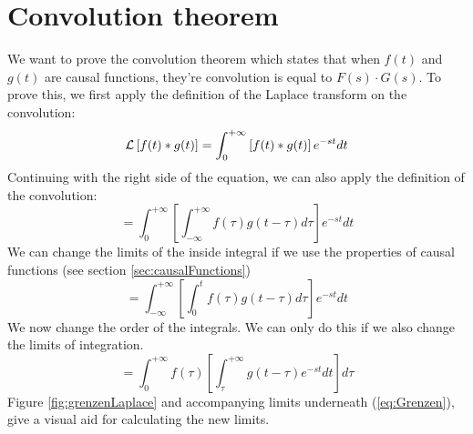 \documentclass[]{subfiles}
\begin{document}
	\section{Convolution theorem}
	We want to prove the convolution theorem which states that when $f(t)$ and $g(t)$ are causal functions, they're convolution is equal to $F(s)\cdot G(s)$. To prove this, we first apply the definition of the Laplace transform on the convolution:
	\begin{equation}
		\mathcal{L}\left[ f(t)\ast g(t)\right]  = \int_{0}^{+\infty}\left[ f(t)\ast g(t)\right] e^{-st}dt
	\end{equation}
	Continuing with the right side of the equation, we can also apply the definition of the convolution:
	\begin{equation}
		=\int_{0}^{+\infty}\left[ \int_{-\infty}^{+\infty}f(\tau)g(t-\tau)d\tau	\right] e^{-st}dt
	\end{equation}
	We can change the limits of the inside integral if we use the properties of causal functions (see section \ref{sec:causalFunctions})
	\begin{equation}
		=\int_{-\infty}^{+\infty}\left[ \int_{0}^{t}f(\tau)g(t-\tau)d\tau\right] e^{-st}dt
	\end{equation}
	We now change the order of the integrals. We can only do this if we also change the limits of integration.
	\begin{equation}
		=\int_{0}^{+\infty}f(\tau)\left[ \int_{\tau}^{+\infty}g(t-\tau)e^{-st}dt\right] d\tau
	\end{equation}
	Figure \ref{fig:grenzenLaplace} and accompanying limits underneath (\ref{eq:Grenzen}), give a visual aid for calculating the new limits.
\end{document}
